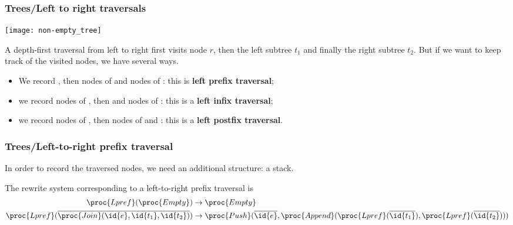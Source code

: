 %
\begin{frame}
\frametitle{Trees/Left to right traversals}

\begin{multicols}{2}%
\begin{center}
\texttt{[image: non-empty\_tree]}
\end{center}

\vfill\columnbreak 

A depth-first traversal from left to right first visits node \(r\),
then the left subtree \(t_1\) and finally the right subtree
\(t_2\). But if we want to keep track of the visited nodes, we have
several ways.
\end{multicols}
\begin{itemize}

  \item We record , then nodes of  and 
  nodes of : this is \textbf{left prefix traversal};

  \item we record nodes of , then  and nodes of
  : this is a \textbf{left infix traversal}; 

  \item we record nodes of , then nodes of  and
  : this is a \textbf{left postfix traversal}.

\end{itemize}

\end{frame}

%
\begin{frame}
\frametitle{Trees/Left-to-right prefix traversal}

In order to record the traversed nodes, we need an additional
structure: a stack.

\bigskip

The rewrite system corresponding to a left-to-right prefix traversal is
\begin{align*}
   \proc{Lpref} (\proc{Empty}) 
&  \rightarrow 
   \proc{Empty}\\
   \proc{Lpref} (\overline{\proc{Join} (\id{e}, \id{t_1}, \id{t_2})}) 
&  \rightarrow 
   \proc{Push} (\overline{\id{e}},
   \proc{Append} (\proc{Lpref} (\overline{\id{t_1}}), \proc{Lpref}
   (\overline{\id{t_2}})))
\end{align*}

\end{frame}

